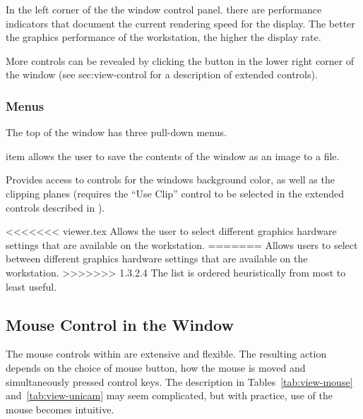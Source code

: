 In the left corner of the the \viewer{} window control panel. there are
performance indicators that document the current rendering speed for the
display.  The better the graphics performance of the workstation, the higher the display rate.

More controls can be revealed by clicking the
\latexhtml{\fbox{+}}{\button{[+]}} button in the lower right corner of
the \viewer{} window (see  {sec:view-control} for a description of extended controls).


\subsubsection{Menus}

The top of the \viewer{} window has three pull-down menus.

\begin{description}
    item allows the user to save the contents of the
  \viewer{} window as an image to a file.
  
   Provides access to controls for the windows 
  background color, as well as the clipping planes
  (requires the ``Use Clip'' control to be selected in the extended
  controls described in ).
  
<<<<<<< viewer.tex
   Allows the user to select different
  graphics hardware settings that are available on the workstation.
=======
   Allows users to select between different
  graphics hardware settings that are available on the workstation.
>>>>>>> 1.3.2.4
  The list is ordered heuristically from most to least useful.
\end{description}

\subsection{Mouse Control in the \viewer{} Window}
\label{sec:view-mouse} 

The mouse controls within \SR{} are extensive and flexible.  The
resulting action depends on the choice of mouse button, how the mouse is moved
and simultaneously pressed control keys.  The
description in Tables~\ref{tab:view-mouse} and~\ref{tab:view-unicam}
may seem complicated, but with practice, use of the mouse becomes intuitive.


